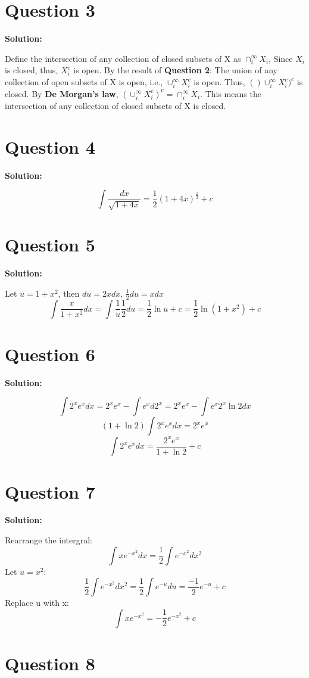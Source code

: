 \documentclass[11pt]{article} %
\begin{document}
\section{Question 3}
\textbf{Solution:}

	Define the intersection of any collection of closed subsets of  X as $\cap_i^\infty X_i$, Since $X_i$ is closed, thus, $X_i^c$ is open. By the result of  \textbf{Question 2}: The union of any collection of open subsets of X is open, i.e., $\cup_i^\infty X_i^c$ is open. Thus, $()\cup_i^\infty X_i^c)^c$ is closed.   By \textbf{De Morgan's law}, $(\cup_i^\infty X_i^c)^c=\cap_i^\infty X_i$. This means the intersection of any collection of closed subsets of  X is closed. 
	
\section{Question 4}
\textbf{Solution:}

$$\int\frac{dx}{\sqrt{1+4x}}=\frac{1}{2}(1+4x)^\frac{1}{2}+c$$
	
	
\section{Question 5}
\textbf{Solution:}

Let $u=1+x^2$, then $du=2xdx$, $\frac{1}{2}du=xdx$
$$\int \frac{x}{1+x^2}dx=\int \frac{1}{u} \frac{1}{2}du=\frac{1}{2}\ln u +c=\frac{1}{2}\ln (1+x^2)+c$$

\section{Question 6}
\textbf{Solution:}

$$\int 2^xe^xdx=2^xe^x-\int e^xd2^x=2^xe^x-\int e^x2^x \ln2 dx$$
$$(1+\ln 2)\int 2^x e^x dx= 2^xe^x$$
$$\int 2^xe^xdx=\frac{2^xe^x}{1+\ln2}+c$$

\section{Question 7}
\textbf{Solution:}

Rearrange the intergral:
$$\int xe^{-x^2}dx=\frac{1}{2}\int e^{-x^2}dx^2$$
Let $u=x^2$:
$$\frac{1}{2}\int e^{-x^2}dx^2=\frac{1}{2}\int e^{-u}du=\frac{-1}{2}e^{-u}+c$$
Replace u with x:
$$\int xe^{-x^2}=-\frac{1}{2}e^{-x^2}+c$$

\section{Question 8}
\end{document}
